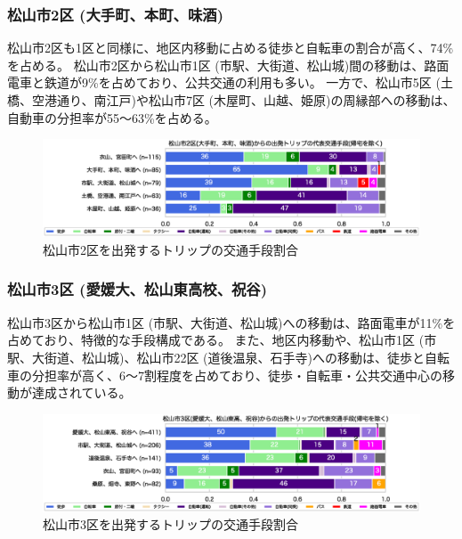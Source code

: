 \documentclass[a4paper,12pt, uplatex]{jsbook}
\begin{document}
\subsubsection{松山市2区 (大手町、本町、味酒)}
松山市2区も1区と同様に、地区内移動に占める徒歩と自転車の割合が高く、74\%を占める。
松山市2区から松山市1区 (市駅、大街道、松山城)間の移動は、路面電車と鉄道が9\%を占めており、公共交通の利用も多い。
一方で、松山市5区 (土橋、空港通り、南江戸)や松山市7区 (木屋町、山越、姫原)の周縁部への移動は、自動車の分担率が55〜63\%を占める。
%
\begin{figure}[H]
    \centering
    \includegraphics[width=1.0\textwidth]{picture/mode_share_松山市2区.eps}
    \caption{松山市2区を出発するトリップの交通手段割合}
    \label{fig:mode_share_2}
\end{figure}

\subsubsection{松山市3区 (愛媛大、松山東高校、祝谷)}
松山市3区から松山市1区 (市駅、大街道、松山城)への移動は、路面電車が11\%を占めており、特徴的な手段構成である。
また、地区内移動や、松山市1区 (市駅、大街道、松山城)、松山市22区 (道後温泉、石手寺)への移動は、徒歩と自転車の分担率が高く、6〜7割程度を占めており、徒歩・自転車・公共交通中心の移動が達成されている。
%
\begin{figure}[H]
    \centering
    \includegraphics[width=1.0\textwidth]{picture/mode_share_松山市3区.eps}
    \caption{松山市3区を出発するトリップの交通手段割合}
    \label{fig:mode_share_3}
\end{figure}
\end{document}
